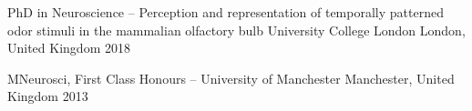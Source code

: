 

\begin{cventries}

  \cventry%
    {PhD in Neuroscience \--- Perception and representation of temporally patterned odor stimuli in the mammalian olfactory bulb} %
    {University College London} %
    {London, United Kingdom} %
    {2018} %
    {%
    }

  \cventry%
    {MNeurosci, First Class Honours \---} %
    {University of Manchester} %
    {Manchester, United Kingdom} %
    {2013} %
    {%
    }
    
\end{cventries}
